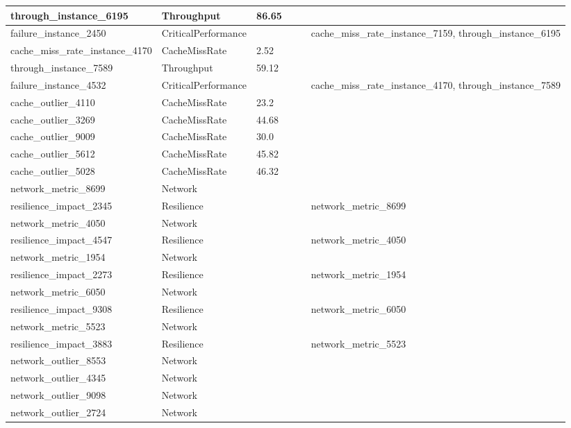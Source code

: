 \begin{longtable}{|l|p{2cm}|l|l|p{3cm}|p{3cm}|}
through\_instance\_6195 & Throughput & 86.65 &  &  &  \\ \hline
failure\_instance\_2450 & CriticalPerformance &  &  &  & cache\_miss\_rate\_instance\_7159, through\_instance\_6195 \\ \hline
cache\_miss\_rate\_instance\_4170 & CacheMissRate & 2.52 &  &  &  \\ \hline
through\_instance\_7589 & Throughput & 59.12 &  &  &  \\ \hline
failure\_instance\_4532 & CriticalPerformance &  &  &  & cache\_miss\_rate\_instance\_4170, through\_instance\_7589 \\ \hline
cache\_outlier\_4110 & CacheMissRate & 23.2 &  &  &  \\ \hline
cache\_outlier\_3269 & CacheMissRate & 44.68 &  &  &  \\ \hline
cache\_outlier\_9009 & CacheMissRate & 30.0 &  &  &  \\ \hline
cache\_outlier\_5612 & CacheMissRate & 45.82 &  &  &  \\ \hline
cache\_outlier\_5028 & CacheMissRate & 46.32 &  &  &  \\ \hline
network\_metric\_8699 & Network &  &  &  &  \\ \hline
resilience\_impact\_2345 & Resilience &  &  &  & network\_metric\_8699 \\ \hline
network\_metric\_4050 & Network &  &  &  &  \\ \hline
resilience\_impact\_4547 & Resilience &  &  &  & network\_metric\_4050 \\ \hline
network\_metric\_1954 & Network &  &  &  &  \\ \hline
resilience\_impact\_2273 & Resilience &  &  &  & network\_metric\_1954 \\ \hline
network\_metric\_6050 & Network &  &  &  &  \\ \hline
resilience\_impact\_9308 & Resilience &  &  &  & network\_metric\_6050 \\ \hline
network\_metric\_5523 & Network &  &  &  &  \\ \hline
resilience\_impact\_3883 & Resilience &  &  &  & network\_metric\_5523 \\ \hline
network\_outlier\_8553 & Network &  &  &  &  \\ \hline
network\_outlier\_4345 & Network &  &  &  &  \\ \hline
network\_outlier\_9098 & Network &  &  &  &  \\ \hline
network\_outlier\_2724 & Network &  &  &  &  \\ \hline

\end{longtable}
